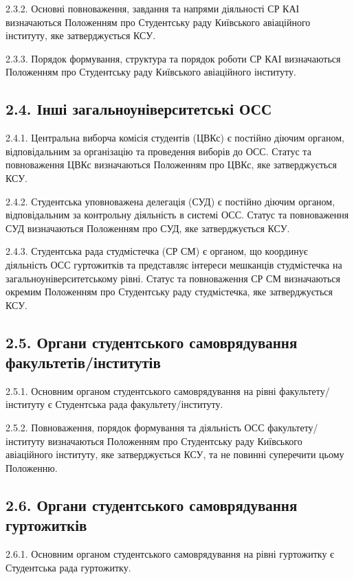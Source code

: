     2.3.2. Основні повноваження, завдання та напрями діяльності СР КАІ визначаються Положенням про Студентську раду Київського авіаційного інституту, яке затверджується КСУ.

    2.3.3. Порядок формування, структура та порядок роботи СР КАІ визначаються Положенням про Студентську раду Київського авіаційного інституту.

\subsection*{2.4. Інші загальноуніверситетські ОСС}
    2.4.1. Центральна виборча комісія студентів (ЦВКс) є постійно діючим органом, відповідальним за організацію та проведення виборів до ОСС. Статус та повноваження ЦВКс визначаються Положенням про ЦВКс, яке затверджується КСУ.

    2.4.2. Студентська уповноважена делегація (СУД) є постійно діючим органом, відповідальним за контрольну діяльність в системі ОСС. Статус та повноваження СУД визначаються Положенням про СУД, яке затверджується КСУ.

    2.4.3. Студентська рада студмістечка (СР СМ) є органом, що координує діяльність ОСС гуртожитків та представляє інтереси мешканців студмістечка на загальноуніверситетському рівні. Статус та повноваження СР СМ визначаються окремим Положенням про Студентську раду студмістечка, яке затверджується КСУ.

\subsection*{2.5. Органи студентського самоврядування факультетів/інститутів}
    2.5.1. Основним органом студентського самоврядування на рівні факультету/інституту є Студентська рада факультету/інституту.

    2.5.2. Повноваження, порядок формування та діяльність ОСС факультету/інституту визначаються Положенням про Студентську раду Київського авіаційного інституту, яке затверджується КСУ, та не повинні суперечити цьому Положенню.

\subsection*{2.6. Органи студентського самоврядування гуртожитків}
    2.6.1. Основним органом студентського самоврядування на рівні гуртожитку є Студентська рада гуртожитку.

